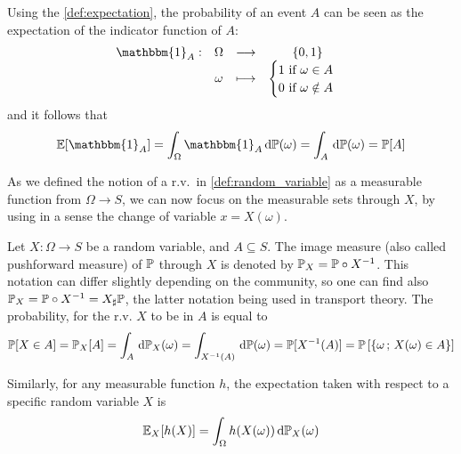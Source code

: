 \documentclass[../../Main_ManuscritThese.tex]{subfiles}
\begin{document}
  Using the \cref{def:expectation}, the probability of an event $A$ can be seen as the expectation of the indicator function of $A$:
  \begin{equation}
    \begin{array}{cccc}
      \mathbbm{1}_{A}:& \Omega& \longrightarrow& \{0,1\} \\
                      & \omega& \longmapsto & \begin{cases}
                        1\text{ if } \omega \in A \\
                        0 \text{ if } \omega \notin A
                                              \end{cases}
    \end{array}
  \end{equation}
  and it follows that
  \begin{equation}
    \Ex[\mathbbm{1}_A] = \int_{\Omega} \mathbbm{1}_A \, \mathrm{d}\Prob(\omega)= \int_{A} \, \mathrm{d}\Prob(\omega) = \Prob[A]
  \end{equation}

  
As we defined the notion of a r.v.\ in \cref{def:random_variable} as a measurable function from $\Omega \to S$, we can now focus on the measurable sets through $X$, by using in a sense the change of variable $x = X(\omega)$. 
\begin{definition}
  \label{def:image_measure}
  Let $X:\Omega \rightarrow S$ be a random variable, and $A \subseteq S$. The image measure (also called pushforward measure) of $\mathbb{P}$ through $X$ is denoted by $\mathbb{P}_X = \mathbb{P} \circ X^{-1}$. This notation can differ slightly depending on the community, so one can find also $ \mathbb{P}_X = \mathbb{P} \circ X^{-1} = X_{\sharp}\mathbb{P}$, the latter notation being used in transport theory. The probability, for the r.v. $X$ to be in $A$ is equal to
  \begin{equation}
    \mathbb{P}[X \in A] = \mathbb{P}_X[A] = \int_{A}\,\mathrm{d}\mathbb{P}_X(\omega) =  \int_{X^{-1}(A)}\,\mathrm{d}\mathbb{P}(\omega) = \mathbb{P}[X^{-1}(A)] = \mathbb{P}\left[\{\omega\,;\,X(\omega) \in A\}\right]
  \end{equation}
  
Similarly, for any measurable function $h$, the expectation taken with respect to a specific random variable $X$ is 
\begin{equation}
  \mathbb{E}_{X}[h(X)] = \int_{\Omega} h(X(\omega)) \,\mathrm{d}\mathbb{P}_{X}(\omega)
\end{equation}
\end{definition}
\end{document}
